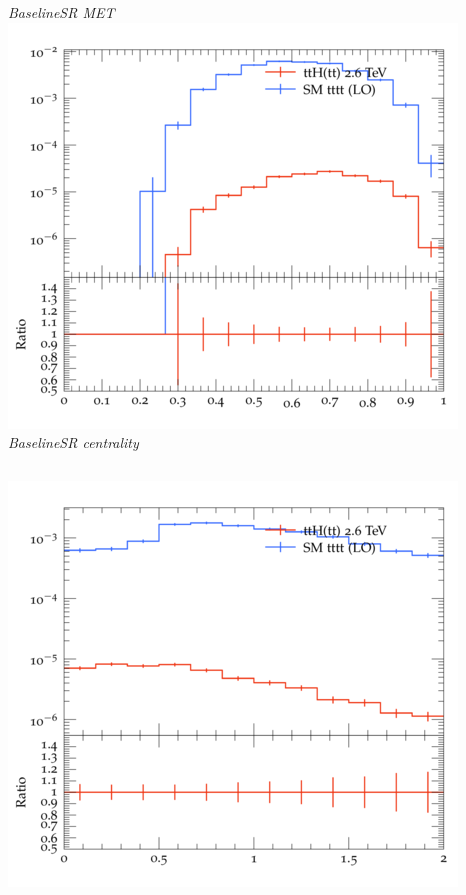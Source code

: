 \documentclass{beamer}
\begin{document}
\begin{frame}
\begin{columns}
\textit{\small BaselineSR MET}
\includegraphics[width=\textwidth]{../plots/ttH_2600/tttt_ttH_1LOS/BaselineSR_centrality.png}\\
\textit{\small BaselineSR centrality}
\end{columns}
\begin{columns}
\includegraphics[width=\textwidth]{../plots/ttH_2600/tttt_ttH_1LOS/BaselineSR_deltaR_bl_min.png}\\

\end{columns}
\end{frame}
\end{document}
